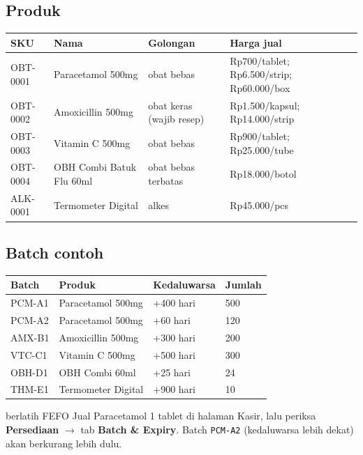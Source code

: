 \documentclass[11pt,a4paper]{article}
\newcommand{\code}[1]{\texttt{\small #1}}
\begin{document}
\subsection{Produk}
\begin{tabularx}{\textwidth}{@{}L{2.4cm}L{4.6cm}L{2.6cm}Y@{}}
  \toprule
  \textbf{SKU} & \textbf{Nama} & \textbf{Golongan} & \textbf{Harga jual} \\
  \midrule
  OBT-0001 & Paracetamol 500mg & obat bebas & Rp700/tablet; Rp6.500/strip; Rp60.000/box \\
  OBT-0002 & Amoxicillin 500mg & obat keras (wajib resep) & Rp1.500/kapsul; Rp14.000/strip \\
  OBT-0003 & Vitamin C 500mg & obat bebas & Rp900/tablet; Rp25.000/tube \\
  OBT-0004 & OBH Combi Batuk Flu 60ml & obat bebas terbatas & Rp18.000/botol \\
  ALK-0001 & Termometer Digital & alkes & Rp45.000/pcs \\
  \bottomrule
\end{tabularx}

\subsection{Batch contoh}
\begin{tabularx}{\textwidth}{@{}L{2.6cm}L{4.4cm}L{3.4cm}Y@{}}
  \toprule
  \textbf{Batch} & \textbf{Produk} & \textbf{Kedaluwarsa} & \textbf{Jumlah} \\
  \midrule
  PCM-A1 & Paracetamol 500mg & +400 hari & 500 \\
  PCM-A2 & Paracetamol 500mg & +60 hari  & 120 \\
  AMX-B1 & Amoxicillin 500mg & +300 hari & 200 \\
  VTC-C1 & Vitamin C 500mg   & +500 hari & 300 \\
  OBH-D1 & OBH Combi 60ml    & +25 hari  & 24 \\
  THM-E1 & Termometer Digital & +900 hari & 10 \\
  \bottomrule
\end{tabularx}

\begin{tipbox}{berlatih FEFO}
Jual Paracetamol 1 tablet di halaman Kasir, lalu periksa
\textbf{Persediaan} $\rightarrow$ tab \textbf{Batch \& Expiry}. Batch
\code{PCM-A2} (kedaluwarsa lebih dekat) akan berkurang lebih dulu.
\end{tipbox}
\end{document}
